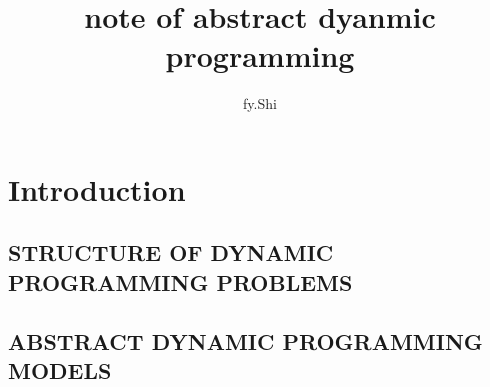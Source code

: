 \documentclass{article}
\title{note of abstract dyanmic programming}
\author{fy.Shi}
\date{}
\begin{document}
\maketitle

\section{Introduction}
\subsection{STRUCTURE OF DYNAMIC PROGRAMMING PROBLEMS}
\subsection{ABSTRACT DYNAMIC PROGRAMMING MODELS}






\end{document}
